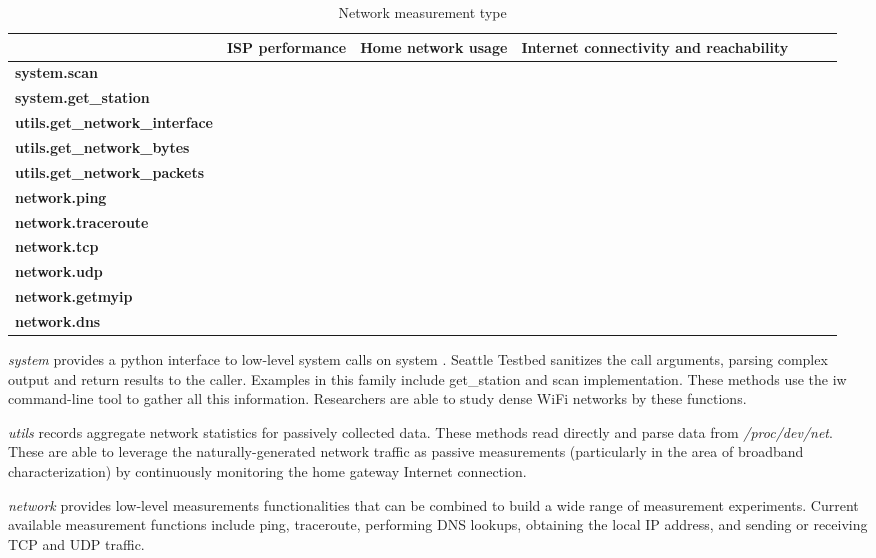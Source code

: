 \begin{table*} %
\scriptsize
\centering
\begin{tabular}{|l|c|c|c|c|c|c|}
\hline
\textbf{}    &  \textbf{ISP performance} & \textbf{Home network usage}  & \textbf{Internet connectivity and reachability}\\
 \hline
 {\bf system.scan} & {\bf *} & {\bf } & {\bf }\\
\hline
 {\bf system.get\_station} & {\bf *} & {\bf *} & {\bf }\\
\hline
 {\bf utils.get\_network\_interface} & {\bf *} & {\bf } & {\bf }\\
\hline
 {\bf utils.get\_network\_bytes} & {\bf *} & {\bf } & {\bf }\\
\hline
 {\bf utils.get\_network\_packets} & {\bf *} & {\bf } & {\bf *}\\
\hline
 {\bf network.ping} & {\bf *} & {\bf } & {\bf *}\\
\hline
 {\bf network.traceroute} & {\bf } & {\bf } & {\bf *}\\
\hline
 {\bf network.tcp} & {\bf *} & {\bf } & {\bf *}\\
\hline
 {\bf network.udp} & {\bf *} & {\bf *} & {\bf }\\
\hline
 {\bf network.getmyip} & {\bf *} & {\bf *} & {\bf *} \\
\hline
 {\bf network.dns} & {\bf *} & {\bf } & {\bf *}\\
\hline
\end{tabular}
\caption {Network measurement type}
\label{table:type}
\end{table*}

\emph{system} provides a python interface to low-level system calls on system
. Seattle Testbed sanitizes the call arguments, parsing complex output and 
return results to the caller. Examples in this family include get\_station 
and scan implementation. These methods use the iw command-line tool 
to gather all this information. Researchers are able to study dense WiFi 
networks by these functions.


\emph{utils} records aggregate network statistics for passively collected 
data. These methods read directly and parse data from \emph{/proc/dev/net}. 
These are able to leverage the naturally-generated network traffic as 
passive measurements (particularly in the area of broadband characterization)
by continuously monitoring the home gateway Internet connection.

\emph{network} provides low-level measurements functionalities that can be 
combined to build a wide range of measurement experiments. Current available 
measurement functions include ping, traceroute, performing DNS lookups, 
obtaining the local IP address, and sending or receiving TCP and UDP traffic.

